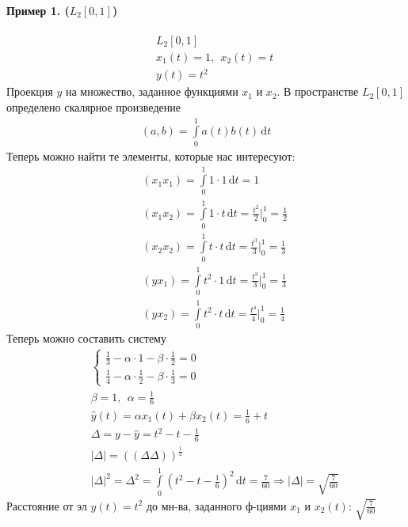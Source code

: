 \documentclass{article}[12pt]
\renewcommand{\d}{\,\mathrm{d}}
\begin{document}
\paragraph{Пример 1. ($L_{2}[0,1]$)}
\begin{eqnarray*}
    &&L_{2}[0,1]\\
    &&x_{1}(t)=1,\ \ x_{2}(t)=t\\
    &&y(t)=t^{2}
\end{eqnarray*}
Проекция $y$ на множество, заданное функциями $x_{1}$ и $x_{2}$. В
пространстве $L_{2}[0,1]$ определено скалярное произведение
\begin{eqnarray*}
    (a,b)=\int\limits_{0}^{1}a(t)b(t)\d{t}
\end{eqnarray*}
Теперь можно найти те элементы, которые нас интересуют:
\begin{eqnarray*}
    &&(x_{1}x_{1})
    =\int\limits_{0}^{1}1\cdot 1\d{t}=1\\
    &&(x_{1}x_{2})
    =\int\limits_{0}^{1}1\cdot t\d{t}
    =\frac{t^{2}}{2}\bigg|^{1}_{0}=\frac{1}{2}\\
    &&(x_{2}x_{2})
    =\int\limits_{0}^{1}t\cdot t\d{t}
    =\frac{t^{3}}{3}\bigg|^{1}_{0}=\frac{1}{3}\\
    &&(yx_{1})
    =\int\limits_{0}^{1}t^{2}\cdot 1\d{t}
    =\frac{t^{3}}{3}\bigg|^{1}_{0}=\frac{1}{3}\\
    &&(yx_{2})=\int\limits_{0}^{1}t^{2}\cdot t\d{t}
    =\frac{t^{4}}{4}\bigg|^{1}_{0}=\frac{1}{4}
\end{eqnarray*}
Теперь можно составить систему
\begin{eqnarray*}
    &&\left\{\begin{aligned}
    \frac{1}{3}-\alpha\cdot 1-\beta\cdot\frac{1}{2}=0\\
    \frac{1}{4}-\alpha\cdot\frac{1}{2}-\beta\cdot\frac{1}{3}=0
    \end{aligned} \right.\\
    &&\beta = 1,\ \ \alpha=\frac{1}{6}\\
    &&\hat{y}(t)=\alpha x_{1}(t)+\beta x_{2}(t)
    =\frac{1}{6}+t\\
    &&\Delta=y-\hat{y}=t^{2}-t-\frac{1}{6}\\
    &&|\Delta|=\left(\left(\Delta\Delta\right)\right)^{\frac{1}{2}}\\
    &&\left|\Delta\right|^{2}=\Delta^{2}
    =\int\limits_{0}^{1}(t^{2}-t-\frac{1}{6})^{2}\d{t}
    =\frac{7}{60} \Rightarrow |\Delta|=\sqrt{\frac{7}{60}}
\end{eqnarray*}
Расстояние от эл $y(t)=t^{2}$ до мн-ва, заданного ф-циями $x_{1}$ и
$x_{2}(t)$: $\sqrt{\frac{7}{60}}$
\end{document}
